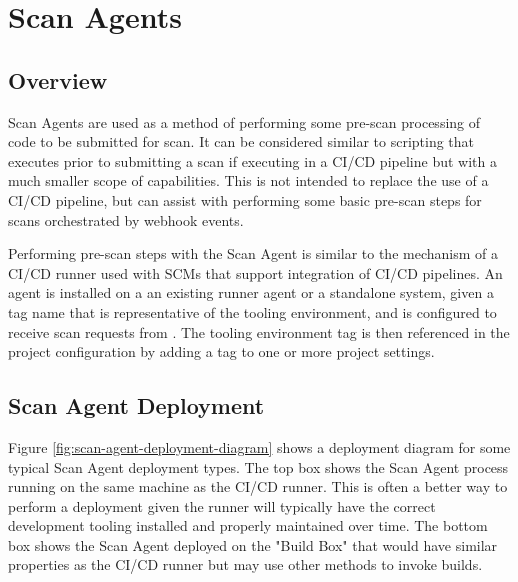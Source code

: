 \chapter{Scan Agents}\label{sec:scan-agents}

\section{Overview}

Scan Agents are used as a method of performing some pre-scan processing of code to be submitted
for scan.  It can be considered similar to scripting that executes prior to submitting a scan
if executing in a CI/CD pipeline but with a much smaller scope of capabilities.  This is not
intended to replace the use of a CI/CD pipeline, but can assist with performing some basic
pre-scan steps for scans orchestrated by webhook events.

Performing pre-scan steps with the Scan Agent is similar to the mechanism of a CI/CD runner
used with SCMs that support integration of CI/CD pipelines.  An agent is installed on
a an existing runner agent or a standalone system, given a tag name that is representative
of the tooling environment, and is configured to receive scan requests from \cxoneflow.
The tooling environment tag is then referenced in the \cxone project configuration by
adding a tag to one or more project settings.


\section{Scan Agent Deployment}

Figure \ref{fig:scan-agent-deployment-diagram} shows a deployment diagram for some typical
Scan Agent deployment types.  The top box shows the Scan Agent process running on the same
machine as the CI/CD runner.  This is often a better way to perform a deployment given the
runner will typically have the correct development tooling installed and properly maintained
over time.  The bottom box shows the Scan Agent deployed on the "Build Box" that would have
similar properties as the CI/CD runner but may use other methods to invoke builds.


